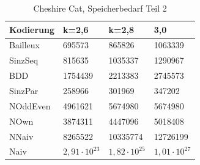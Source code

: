 \documentclass[a4,abstract=on]{scrartcl}
\begin{document}
\begin{landscape}
 \begin{table}[h!]
    \small
    \setlength{\tabcolsep}{0.11cm}
     \centering
     \begin{tabular}[width=\textwidth]{|l||l|l|l|}
	\hline
       \textbf{Kodierung} &\textbf{k=2,6} &\textbf{k=2,8} & \textbf{3,0}\\
	\hline
	\hline
	Bailleux & 695573 & 865826 & 1063339\\
\hline
	SinzSeq &  815635 & 1035337 & 1290967 \\
\hline
	BDD & 1754439 & 2213383 & 2745573\\
\hline
	SinzPar & 258966 & 301969  & 347202 \\
\hline
	NOddEven & 4961621 & 5674980 & 5674980\\
\hline
	NOwn &  3874311 & 4447096 & 5018408\\
 \hline
	NNaiv &  8265522 & 10335774 & 12726199\\
\hline
	Naiv &  $2,91 \cdot 10^{23}$ &  $1,82 \cdot 10^{25}$ & $1,01 \cdot 10^{27}$\\
\hline
       
     \end{tabular}

     \caption{Cheshire Cat, Speicherbedarf Teil 2}
     \label{tbl:beispieltabelle}

   \end{table}


\end{landscape}
\end{document}
